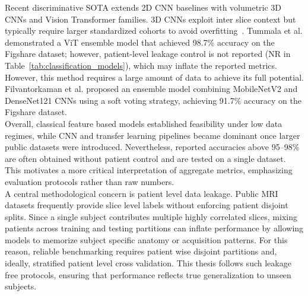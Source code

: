 Recent discriminative SOTA extends 2D CNN baselines with volumetric 3D CNNs and Vision Transformer families. 3D CNNs exploit inter slice context but typically require larger standardized cohorts to avoid overfitting~\cite{bharathraj2025implementation3dcnn}. Tummala et al. \cite{Tummala2022BrainTumorViT} demonstrated a ViT ensemble model that achieved 98.7\% accuracy on the Figshare dataset; however, patient-level leakage control is not reported (NR in Table~\ref{tab:classification_models}), which may inflate the reported metrics. However, this method requires a large amount of data to achieve its full potential. Filvantorkaman et al. \cite{filvantorkaman2025fusionbasedbraintumorclassification} proposed an ensemble model combining MobileNetV2 and DenseNet121 CNNs using a soft voting strategy, achieving 91.7\% accuracy on the Figshare dataset.
\\

Overall, classical feature based models established feasibility under low data regimes, while CNN and transfer learning pipelines became dominant once larger public datasets were introduced. Nevertheless, reported accuracies above 95–98\% are often obtained without patient control and are tested on a single dataset. This motivates a more critical interpretation of aggregate metrics, emphasizing evaluation protocols rather than raw numbers.\\

A central methodological concern is patient level data leakage. Public MRI datasets frequently provide slice level labels without enforcing patient disjoint splits. Since a single subject contributes multiple highly correlated slices, mixing patients across training and testing partitions can inflate performance by allowing models to memorize subject specific anatomy or acquisition patterns. For this reason, reliable benchmarking requires patient wise disjoint partitions and, ideally, stratified patient level cross validation. This thesis follows such leakage free protocols, ensuring that performance reflects true generalization to unseen subjects.\\

